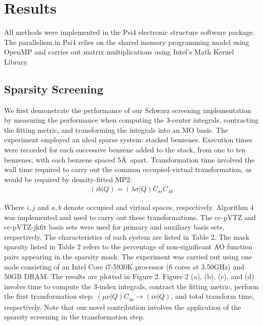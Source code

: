 \chapter{Results}

All methods were implemented in the {\sc Psi4} electronic structure software package.
The parallelism in {\sc Psi4} relies on the shared memory programming model using OpenMP 
and carries out matrix multiplications using Intel's Math Kernel
Library. 

\section{Sparsity Screening}

We first demonstrate the performance of our Schwarz screening implementation 
by measuring the performance when computing the 3-center integrals, contracting the fitting metric,
and transforming the integrals into an MO basis.
The experiment employed an ideal sparse system: stacked benzenes. Execution times were recorded for each successive benzene
added to the stack, from one to ten benzenes, with each benzene spaced 5\AA\ apart.
Transformation time involved the wall time required to carry out the common occupied-virtual
transformation, as would be required by density-fitted MP2: 
\begin{align} 
(i b | Q) = (\lambda \sigma | Q) C_{\sigma i} C_{\lambda b} 
\end{align}

\noindent Where $i, j$ and $a, b$ denote occupied and virtual spaces, respectively. 
Algorithm 4 was implemented and used to carry out these transformations.
The cc-pVTZ and cc-pVTZ-jkfit basis sets were used for primary 
and auxiliary basis sets, respectively. The characteristics
of each system are listed in Table 2. The mask sparsity listed in Table 2 refers to the percentage of non-significant AO function pairs appearing in the sparsity mask.
The experiment was carried out using one node consisting of an Intel Core i7-5930K processor 
(6 cores at 3.50GHz) and 50GB DRAM. The results are plotted in Figure 2. Figure 2 (a), (b), (c), and (d) involve time to compute the 3-index integrals, contract the fitting metric,
perform the first transformation step: $(\mu \nu | Q)C_{i \mu} \rightarrow (i \nu | Q)$,
and total transform time, respectively.
Note that our novel contribution involves the application of the sparsity screening in the transformation step.

